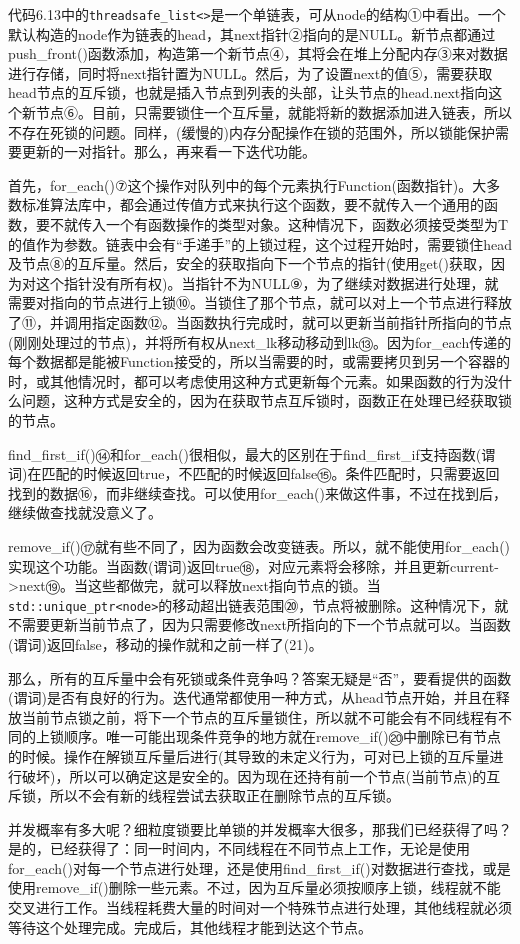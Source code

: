 代码6.13中的\texttt{threadsafe\_list<>}是一个单链表，可从node的结构①中看出。一个默认构造的node作为链表的head，其next指针②指向的是NULL。新节点都通过push\_front()函数添加，构造第一个新节点④，其将会在堆上分配内存③来对数据进行存储，同时将next指针置为NULL。然后，为了设置next的值⑤，需要获取head节点的互斥锁，也就是插入节点到列表的头部，让头节点的head.next指向这个新节点⑥。目前，只需要锁住一个互斥量，就能将新的数据添加进入链表，所以不存在死锁的问题。同样，(缓慢的)内存分配操作在锁的范围外，所以锁能保护需要更新的一对指针。那么，再来看一下迭代功能。

首先，for\_each()⑦这个操作对队列中的每个元素执行Function(函数指针)。大多数标准算法库中，都会通过传值方式来执行这个函数，要不就传入一个通用的函数，要不就传入一个有函数操作的类型对象。这种情况下，函数必须接受类型为T的值作为参数。链表中会有“手递手”的上锁过程，这个过程开始时，需要锁住head及节点⑧的互斥量。然后，安全的获取指向下一个节点的指针(使用get()获取，因为对这个指针没有所有权)。当指针不为NULL⑨，为了继续对数据进行处理，就需要对指向的节点进行上锁⑩。当锁住了那个节点，就可以对上一个节点进行释放了⑪，并调用指定函数⑫。当函数执行完成时，就可以更新当前指针所指向的节点(刚刚处理过的节点)，并将所有权从next\_lk移动移动到lk⑬。因为for\_each传递的每个数据都是能被Function接受的，所以当需要的时，或需要拷贝到另一个容器的时，或其他情况时，都可以考虑使用这种方式更新每个元素。如果函数的行为没什么问题，这种方式是安全的，因为在获取节点互斥锁时，函数正在处理已经获取锁的节点。

find\_first\_if()⑭和for\_each()很相似，最大的区别在于find\_first\_if支持函数(谓词)在匹配的时候返回true，不匹配的时候返回false⑮。条件匹配时，只需要返回找到的数据⑯，而非继续查找。可以使用for\_each()来做这件事，不过在找到后，继续做查找就没意义了。

remove\_if()⑰就有些不同了，因为函数会改变链表。所以，就不能使用for\_each()实现这个功能。当函数(谓词)返回true⑱，对应元素将会移除，并且更新current->next⑲。当这些都做完，就可以释放next指向节点的锁。当\texttt{std::unique\_ptr<node>}的移动超出链表范围⑳，节点将被删除。这种情况下，就不需要更新当前节点了，因为只需要修改next所指向的下一个节点就可以。当函数(谓词)返回false，移动的操作就和之前一样了(21)。

那么，所有的互斥量中会有死锁或条件竞争吗？答案无疑是“否”，要看提供的函数(谓词)是否有良好的行为。迭代通常都使用一种方式，从head节点开始，并且在释放当前节点锁之前，将下一个节点的互斥量锁住，所以就不可能会有不同线程有不同的上锁顺序。唯一可能出现条件竞争的地方就在remove\_if()⑳中删除已有节点的时候。操作在解锁互斥量后进行(其导致的未定义行为，可对已上锁的互斥量进行破坏)，所以可以确定这是安全的。因为现在还持有前一个节点(当前节点)的互斥锁，所以不会有新的线程尝试去获取正在删除节点的互斥锁。

并发概率有多大呢？细粒度锁要比单锁的并发概率大很多，那我们已经获得了吗？是的，已经获得了：同一时间内，不同线程在不同节点上工作，无论是使用for\_each()对每一个节点进行处理，还是使用find\_first\_if()对数据进行查找，或是使用remove\_if()删除一些元素。不过，因为互斥量必须按顺序上锁，线程就不能交叉进行工作。当线程耗费大量的时间对一个特殊节点进行处理，其他线程就必须等待这个处理完成。完成后，其他线程才能到达这个节点。

